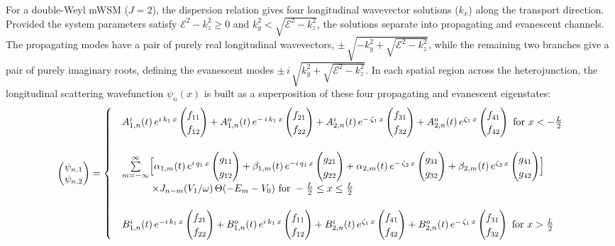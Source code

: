 \documentclass[aps,prb,onecolumn,longbibliography,nofootinbib,citeautoscript,10pt]{revtex4-2}
\newcommand\pmtx[1]{\begin{pmatrix}#1\end{pmatrix}} %
\begin{document}
For a double-Weyl mWSM ($J=2$), the dispersion relation gives four longitudinal wavevector solutions ($k_x$) along the transport direction. Provided the system parameters satisfy $\mathcal{E}^2 - k_z^2 \ge 0$ and $k_y^2 < \sqrt{\mathcal{E}^2 - k_z^2}$, the solutions separate into propagating and evanescent channels. The propagating modes have a pair of purely real longitudinal wavevectors, $\pm  \, \sqrt{-k_y^2 + \sqrt{\mathcal{E}^2 - k_z^2}}$, while the remaining two branches give a pair of purely imaginary roots, defining the evanescent modes $\pm \, i \,\sqrt{k_y^2 + \sqrt{\mathcal{E}^2 - k_z^2}}$. In each spatial region across the heterojunction, the longitudinal scattering wavefunction $\psi_n(x)$ is built as a superposition of these four propagating and evanescent eigenstates:
\begin{align} 
\label{eq1:double_psi}
\pmtx{\psi_{n,1} \\ \psi_{n,2} } =
\begin{cases}
& A_{1,n}^{i}(t) \,e^{i \, k_1 \, x} \pmtx{f_{11} \\ f_{12}}
	+ A_{1,n}^{o}(t) \,e^{- \,i \, k_1 \, x} \pmtx{f_{21} \\ f_{22}}
	+ A_{2,n}^{i}(t) \,e^{ -\, \zeta_1 \, x} \pmtx{f_{31} \\ f_{32}}
	+ A_{2,n}^{o}(t) \,e^{ \zeta_1 \, x} \pmtx{f_{41} \\ f_{42}}
 \text{ for } x< -\frac{L} {2} \\ & \\
& \sum \limits _{m=-\infty}^\infty
\Bigl[ \alpha_{1,m}(t) \,e^{i \, q_1\, x} \pmtx{g_{11} \\ g_{12}}
	+ \beta_{1,m}(t) \,e^{-i \, q_1 \,x} \pmtx{g_{21} \\ g_{22}}
	+ \alpha_{2,m}(t) \,e^{-\, \zeta_2 \,x} \pmtx{g_{31} \\ g_{32}}
	+ \beta_{2,m}(t) \,e^{ \zeta_2 \, x} \pmtx{g_{41} \\ g_{42}} \Bigr]
\\ & \qquad \quad \times J_{n-m} ( {V_{1}} /{\omega} ) \, \Theta(-E_m-V_0)
\text{ for } -\frac{L} {2} \le x \le \frac{L} {2} \\ & \\
&	B_{1,n}^{i}(t) \,e^{-i \, k_1 \, x} \pmtx{f_{21} \\ f_{22}}
	+ B_{1,n}^{o}(t) \,e^{i \, k_1 \, x} \pmtx{f_{11} \\ f_{12}}
	+ B_{2,n}^{i}(t) \,e^{ \zeta_1 \, x} \pmtx{f_{41} \\ f_{42}}
	+ B_{2,n}^{o}(t) \,e^{  - \,\zeta_1 \, x} \pmtx{f_{31} \\ f_{32}}
 \text{ for } x> \frac{L} {2}
\end{cases}
\end{align}
\end{document}
